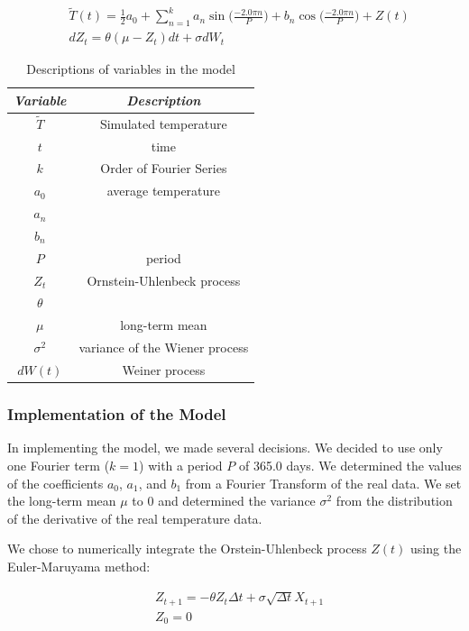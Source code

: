 \documentclass[11pt, letterpaper]{article}
\begin{document}
\begin{align}
&\tilde{T}(t) = \frac{1}{2}a_0 + \sum_{n=1}^k a_n \sin\Big(\frac{-2.0 \pi n}{P}\Big) + b_n \cos\Big(\frac{-2.0 \pi n}{P}\Big) + Z(t) \\
&dZ_t = \theta (\mu - Z_t)dt + \sigma dW_t
\end{align}

\begin{table}[H]
  \centering
  \begin{tabular}{c c} \hline
  \emph{Variable} & \emph{Description}\\ \hline
  $\tilde{T}$ & Simulated temperature \\ \hline
  $t$ & time \\ \hline
  $k$ & Order of Fourier Series \\ \hline
  $a_0$ & average temperature \\ \hline
  $a_n$ & \\ \hline
  $b_n$ &  \\ \hline
  $P$ & period  \\ \hline
  $Z_t$ & Ornstein-Uhlenbeck process \\ \hline
  $\theta$ & \\ \hline
  $\mu$ & long-term mean \\ \hline
  $\sigma^2$ & variance of the Wiener process \\ \hline
  $dW(t)$ & Weiner process \\ \hline 
  \end{tabular}
  \caption{Descriptions of variables in the model}
  \label{tab:analysis-ft-values}
\end{table}


\subsubsection{Implementation of the Model}
In implementing the model, we made several decisions.  We decided to use only one Fourier term ($k=1$) with a period $P$ of 365.0 days.  We determined the values of the coefficients $a_0$, $a_1$, and $b_1$ from a Fourier Transform of the real data.  We set the long-term mean $\mu$ to 0 and determined the variance $\sigma^2$ from the distribution of the derivative of the real temperature data.

We chose to numerically integrate the Orstein-Uhlenbeck process $Z(t)$ using the Euler-Maruyama method:

\begin{align}
&Z_{t+1} = - \theta Z_t \Delta t + \sigma \sqrt{\Delta t} X_{t+1} \\
&Z_0 = 0
\end{align}
\end{document}
